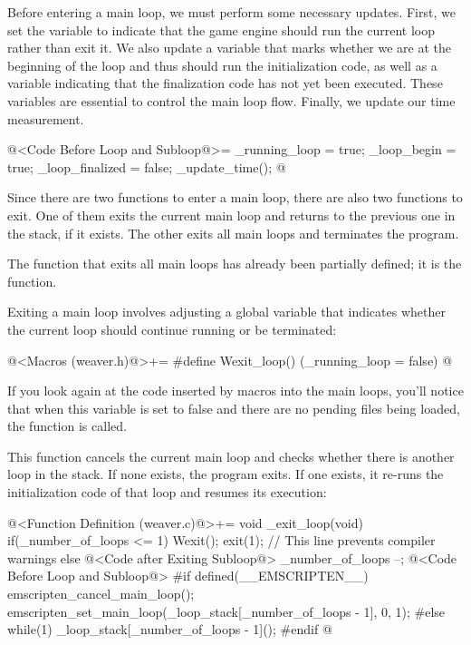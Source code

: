 Before entering a main loop, we must perform some necessary
updates. First, we set the  variable to
indicate that the game engine should run the current loop rather than
exit it. We also update a variable that marks whether we are at the
beginning of the loop and thus should run the initialization code, as
well as a variable indicating that the finalization code has not yet
been executed. These variables are essential to control the main loop
flow. Finally, we update our time measurement.

\iniciocodigo
@<Code Before Loop and Subloop@>=
_running_loop = true;
_loop_begin = true;
_loop_finalized = false;
_update_time();
@
\fimcodigo


Since there are two functions to enter a main loop, there are also two
functions to exit. One of them exits the current main loop and returns
to the previous one in the stack, if it exists. The other exits all
main loops and terminates the program.

The function that exits all main loops has already been partially
defined; it is the  function.

Exiting a main loop involves adjusting a global variable that
indicates whether the current loop should continue running or be
terminated:

\iniciocodigo
@<Macros (weaver.h)@>+=
#define Wexit_loop() (_running_loop = false)
@
\fimcodigo

If you look again at the code inserted by macros into the main loops,
you’ll notice that when this variable is set to false and there are no
pending files being loaded, the function  is
called.

This function cancels the current main loop and checks whether there
is another loop in the stack. If none exists, the program exits. If
one exists, it re-runs the initialization code of that loop and
resumes its execution:

\iniciocodigo
@<Function Definition (weaver.c)@>+=
void _exit_loop(void){
  if(_number_of_loops <= 1){
    Wexit();
    exit(1); // This line prevents compiler warnings
  }
  else{
    @<Code after Exiting Subloop@>
    _number_of_loops --;
    @<Code Before Loop and Subloop@>
#if defined(__EMSCRIPTEN__)
    emscripten_cancel_main_loop();
    emscripten_set_main_loop(_loop_stack[_number_of_loops - 1], 0, 1);
#else
    while(1)
      _loop_stack[_number_of_loops - 1]();
#endif
  }
}
@
\fimcodigo

